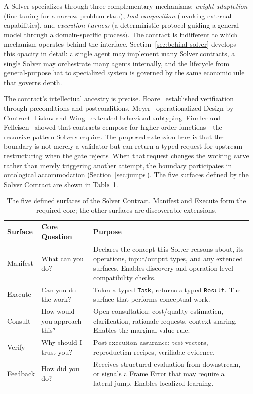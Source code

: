 \documentclass[11pt]{article}
\let\oldtexttt\texttt
\renewcommand{\texttt}[1]{\oldtexttt{\small #1}}
\begin{document}
A Solver specializes through three complementary mechanisms: \emph{weight adaptation} (fine-tuning for a narrow problem class), \emph{tool composition} (invoking external capabilities), and \emph{execution harness} (a deterministic protocol guiding a general model through a domain-specific process). The contract is indifferent to which mechanism operates behind the interface. Section~\ref{sec:behind-solver} develops this opacity in detail: a single agent may implement many Solver contracts, a single Solver may orchestrate many agents internally, and the lifecycle from general-purpose hat to specialized system is governed by the same economic rule that governs depth.

The contract's intellectual ancestry is precise. Hoare~\cite{hoare1969} established verification through preconditions and postconditions. Meyer~\cite{meyer1992dbc} operationalized Design by Contract. Liskov and Wing~\cite{liskov1994} extended behavioral subtyping. Findler and Felleisen~\cite{findler2002} showed that contracts compose for higher-order functions---the recursive pattern Solvers require. The proposed extension here is that the boundary is not merely a validator but can return a typed request for upstream restructuring when the gate rejects. When that request changes the working carve rather than merely triggering another attempt, the boundary participates in ontological accommodation (Section~\ref{sec:jumps}). The five surfaces defined by the Solver Contract are shown in Table~\ref{tab:contract}.

\begin{table}[H]
\centering
\small
\caption{The five defined surfaces of the Solver Contract. Manifest and Execute form the required core; the other surfaces are discoverable extensions.}
\label{tab:contract}
\begin{tabular}{@{}llp{9cm}@{}}
\toprule
\textbf{Surface} & \textbf{Core Question} & \textbf{Purpose} \\
\midrule
Manifest & What can you do? & Declares the concept this Solver reasons about, its operations, input/output types, and any extended surfaces. Enables discovery and operation-level compatibility checks. \\
Execute & Can you do the work? & Takes a typed \texttt{Task}, returns a typed \texttt{Result}. The surface that performs conceptual work. \\
Consult & How would you approach this? & Open consultation: cost/quality estimation, clarification, rationale requests, context-sharing. Enables the marginal-value rule. \\
Verify & Why should I trust you? & Post-execution assurance: test vectors, reproduction recipes, verifiable evidence. \\
Feedback & How did you do? & Receives structured evaluation from downstream, or signals a Frame Error that may require a lateral jump. Enables localized learning. \\
\bottomrule
\end{tabular}
\end{table}
\end{document}
